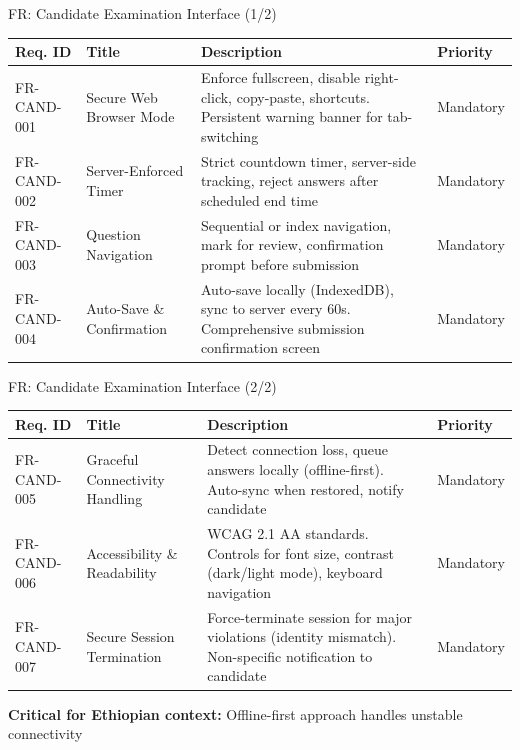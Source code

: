 \begin{frame}{FR: Candidate Examination Interface (1/2)}
    \begin{table}[]
        \centering
        \tiny
        \begin{tabular}{|l|p{3cm}|p{5.5cm}|l|}
            \hline
            \textbf{Req. ID} & \textbf{Title} & \textbf{Description} & \textbf{Priority} \\
            \hline
            FR-CAND-001 & Secure Web Browser Mode & Enforce fullscreen, disable right-click, copy-paste, shortcuts. Persistent warning banner for tab-switching & Mandatory \\
            \hline
            FR-CAND-002 & Server-Enforced Timer & Strict countdown timer, server-side tracking, reject answers after scheduled end time & Mandatory \\
            \hline
            FR-CAND-003 & Question Navigation & Sequential or index navigation, mark for review, confirmation prompt before submission & Mandatory \\
            \hline
            FR-CAND-004 & Auto-Save \& Confirmation & Auto-save locally (IndexedDB), sync to server every 60s. Comprehensive submission confirmation screen & Mandatory \\
            \hline
        \end{tabular}
    \end{table}
\end{frame}

\begin{frame}{FR: Candidate Examination Interface (2/2)}
    \begin{table}[]
        \centering
        \tiny
        \begin{tabular}{|l|p{3cm}|p{5.5cm}|l|}
            \hline
            \textbf{Req. ID} & \textbf{Title} & \textbf{Description} & \textbf{Priority} \\
            \hline
            FR-CAND-005 & Graceful Connectivity Handling & Detect connection loss, queue answers locally (offline-first). Auto-sync when restored, notify candidate & Mandatory \\
            \hline
            FR-CAND-006 & Accessibility \& Readability & WCAG 2.1 AA standards. Controls for font size, contrast (dark/light mode), keyboard navigation & Mandatory \\
            \hline
            FR-CAND-007 & Secure Session Termination & Force-terminate session for major violations (identity mismatch). Non-specific notification to candidate & Mandatory \\
            \hline
        \end{tabular}
    \end{table}
    
    \vspace{0.3cm}
    \textbf{Critical for Ethiopian context:} Offline-first approach handles unstable connectivity
\end{frame}

